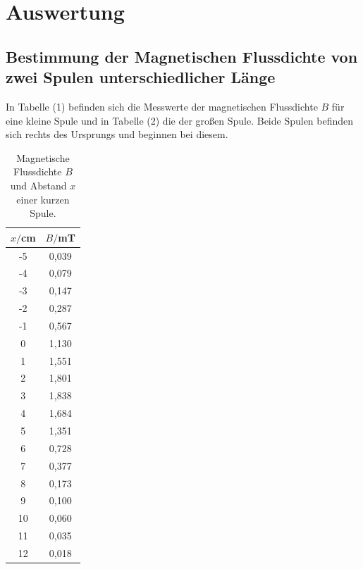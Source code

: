 \section{Auswertung}
\label{sec:Auswertung}

\subsection{Bestimmung der Magnetischen Flussdichte von zwei Spulen unterschiedlicher Länge}
In Tabelle (1) befinden sich die Messwerte der magnetischen Flussdichte $B$ für eine kleine Spule und in Tabelle (2) die der großen Spule.
Beide Spulen befinden sich rechts des Ursprungs und beginnen bei diesem.

\begin{minipage}{0.5\textwidth}
\begin{table}[H]
  \centering
  \caption{Magnetische Flussdichte $B$ \\ und Abstand $x$ einer kurzen Spule.}
  \begin{tabular}{c c}
    \toprule
     $x/$cm & $B/$mT  \\
    \midrule
    -5 & 0,039 \\
    -4 & 0,079 \\
    -3 & 0,147 \\
    -2 & 0,287 \\
    -1 & 0,567 \\
    0 & 1,130\\
    1 & 1,551 \\
    2 & 1,801 \\
    3 & 1,838 \\
    4 & 1,684 \\
    5 & 1,351 \\
    6 & 0,728 \\
    7 & 0,377 \\
    8 & 0,173 \\
    9 & 0,100 \\
    10 & 0,060 \\
    11 & 0,035 \\
    12 & 0,018 \\
  \bottomrule
  \end{tabular}
\end{table}
\end{minipage}
